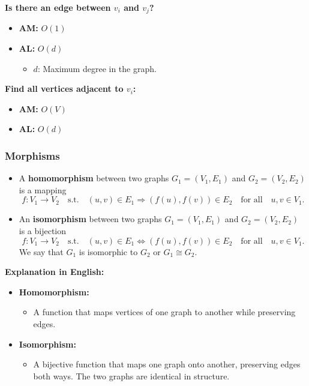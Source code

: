 \textbf{Is there an edge between $v_i$ and $v_j$?}
\begin{itemize}
    \item \textbf{AM:} $O(1)$
    \item \textbf{AL:} $O(d)$ 
    \begin{itemize}
        \item $d$: Maximum degree in the graph.
    \end{itemize}
\end{itemize}
\vspace{1em}

\textbf{Find all vertices adjacent to $v_i$:}
\begin{itemize}
    \item \textbf{AM:} $O(V)$ 
    \item \textbf{AL:} $O(d)$ 
\end{itemize}

\subsubsection{Morphisms}
\begin{definition}
    \begin{itemize}
        \item A \textbf{homomorphism} between two graphs $G_1 = (V_1, E_1)$ and $G_2 = (V_2, E_2)$ is a mapping
        \[
        f: V_1 \to V_2 \quad \text{s.t.} \quad (u, v) \in E_1 \Rightarrow (f(u), f(v)) \in E_2 \quad \text{for all} \quad u, v \in V_1.
        \]
        \item An \textbf{isomorphism} between two graphs $G_1 = (V_1, E_1)$ and $G_2 = (V_2, E_2)$ is a bijection
        \[
        f: V_1 \to V_2 \quad \text{s.t.} \quad (u, v) \in E_1 \iff (f(u), f(v)) \in E_2 \quad \text{for all} \quad u, v \in V_1.
        \]
        We say that $G_1$ is isomorphic to $G_2$ or $G_1 \cong G_2$.
    \end{itemize}
    
    \textbf{Explanation in English:}
    \begin{itemize}
        \item \textbf{Homomorphism:}
        \begin{itemize}
            \item A function that maps vertices of one graph to another while preserving edges.
        \end{itemize}

        \item \textbf{Isomorphism:}
        \begin{itemize}
            \item A bijective function that maps one graph onto another, preserving edges both ways. The two graphs are identical in structure.
        \end{itemize}
    \end{itemize}
\end{definition}

